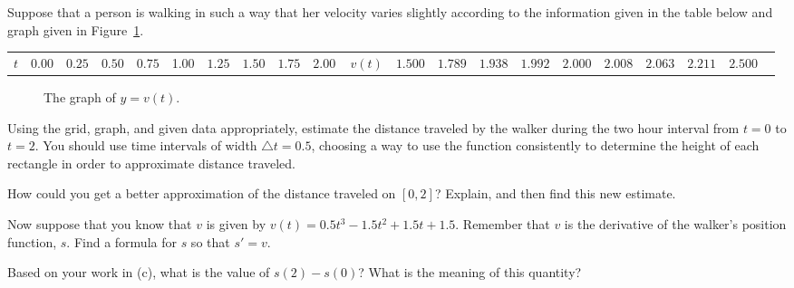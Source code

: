 \begin{activity} \label{A:4.1.1}  Suppose that a person is walking in such a way that her velocity varies slightly according to the information given in the table below and graph given in Figure~\ref{F:4.1.Act1}.
\begin{center} 
\begin{tabular}{c|c|c|c|c|c|c|c|c|c}
$t$ & 0.00 & $0.25$ & $0.50$ & $0.75$ & 1.00 & $1.25$ & $1.50$ & $1.75$ & $2.00$ \ \hline %
$v(t)$ & $1.500$ & $1.789$ & $1.938$ & $1.992$ & $2.000$ & $2.008$ & $2.063$ & $2.211$ & $2.500$ \ %
\end{tabular}
\end{center}
\begin{figure}[h]
\begin{center}
\end{center}
\caption{The graph of $y = v(t)$.} \label{F:4.1.Act1}
\end{figure}
\ba
	\item Using the grid, graph, and given data appropriately, estimate the distance traveled by the walker during the two hour interval from $t = 0$ to $t = 2$.  You should use time intervals of width $\triangle t = 0.5$, choosing a way to use the function consistently to determine the height of each rectangle in order to approximate distance traveled.
	\item How could you get a better approximation of the distance traveled on $[0,2]$?  Explain, and then find this new estimate.
	\item Now suppose that you know that $v$ is given by $v(t) = 0.5t^3-1.5t^2+1.5t+1.5$. Remember that $v$ is the derivative of the walker's position function, $s$.  Find a formula for $s$ so that $s' = v$.
	\item Based on your work in (c), what is the value of $s(2) - s(0)$?  What is the meaning of this quantity? 
\ea
\end{activity}
